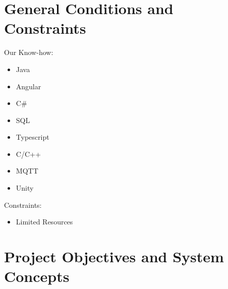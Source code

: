 \documentclass[12pt]{article}
\theoremstyle{definition}
\begin{document}
\pagebreak

\section{General Conditions and Constraints}

Our Know-how:
\begin{itemize}
	\item Java
	\item Angular
	\item C\#
	\item SQL
	\item Typescript
	\item C/C++
	\item MQTT
	\item Unity
\end{itemize}
\newline
Constraints:
\begin{itemize}
	\item Limited Resources
\end{itemize}

\pagebreak

\section{Project Objectives and System Concepts}
\end{document}
